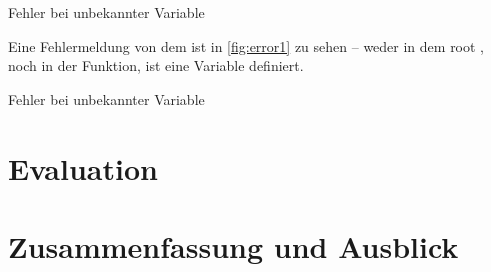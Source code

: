 {{    \begin{myCodeEnv}
      \centering
      \begin{myInvBox}[width=.9\linewidth]
        
      \end{myInvBox}
      \caption{Fehler bei unbekannter Variable}
      \label{fig:error2}
    \end{myCodeEnv}

    Eine Fehlermeldung von dem  ist in \autoref{fig:error1} zu sehen -- weder in dem root , noch in der  Funktion, ist eine Variable  definiert.
    \begin{myCodeEnv}
      \centering
      \begin{myInvBox}[width=.9\linewidth]
        
      \end{myInvBox}
      \caption{Fehler bei unbekannter Variable}
      \label{fig:error1}
    \end{myCodeEnv}

\section{Evaluation}
\label{sec:Evaluation}


\section{Zusammenfassung und Ausblick}
\label{sec:Zusammenfassung und Ausblick}

}}
